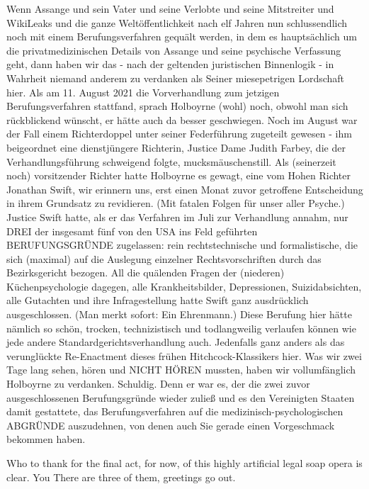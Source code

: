 \begin{multicols}{2}
{Wenn Assange und sein Vater und seine Verlobte und
seine Mitstreiter und WikiLeaks und die ganze Weltöffentlichkeit nach elf Jahren nun schlussendlich noch mit
einem Berufungsverfahren gequält werden, in dem es
hauptsächlich um die privatmedizinischen Details von
Assange und seine psychische Verfassung geht, dann haben wir das - nach der geltenden juristischen Binnenlogik - in Wahrheit niemand anderem zu verdanken als
Seiner miesepetrigen Lordschaft hier.\textCR
Als am 11. August 2021 die Vorverhandlung zum jetzigen
Berufungsverfahren stattfand, sprach Holboyrne (wohl)
noch, obwohl man sich rückblickend wünscht, er hätte
auch da besser geschwiegen. Noch im August war der
Fall einem Richterdoppel unter seiner Federführung zugeteilt gewesen - ihm beigeordnet eine dienstjüngere
Richterin, Justice Dame Judith Farbey, die der Verhandlungsführung schweigend folgte, mucksmäuschenstill.\textCR
Als (seinerzeit noch) vorsitzender Richter hatte Holboyrne es gewagt, eine vom Hohen Richter Jonathan Swift,
wir erinnern uns, erst einen Monat zuvor getroffene Entscheidung in ihrem Grundsatz zu revidieren. (Mit fatalen Folgen für unser aller Psyche.) Justice Swift hatte, als
er das Verfahren im Juli zur Verhandlung annahm, nur
DREI der insgesamt fünf von den USA ins Feld geführten BERUFUNGSGRÜNDE zugelassen: rein rechtstechnische und formalistische, die sich (maximal) auf die
Auslegung einzelner Rechtsvorschriften durch das Bezirksgericht bezogen. All die quälenden Fragen der (niederen) Küchenpsychologie dagegen, alle Krankheitsbilder, Depressionen, Suizidabsichten, alle Gutachten und
ihre Infragestellung hatte Swift ganz ausdrücklich ausgeschlossen. (Man merkt sofort: Ein Ehrenmann.)\textCR
Diese Berufung hier hätte nämlich so schön, trocken,
technizistisch und todlangweilig verlaufen können wie
jede andere Standardgerichtsverhandlung auch. Jedenfalls ganz anders als das verunglückte Re-Enactment
dieses frühen Hitchcock-Klassikers hier.\textCR
Was wir zwei Tage lang sehen, hören und NICHT HÖREN mussten, haben wir vollumfänglich Holboyrne zu
verdanken. Schuldig. Denn er war es, der die zwei zuvor
ausgeschlossenen Berufungsgründe wieder zuließ und
es den Vereinigten Staaten damit gestattete, das Berufungsverfahren auf die medizinisch-psychologischen
ABGRÜNDE auszudehnen, von denen auch Sie gerade
einen Vorgeschmack bekommen haben.}



Who to thank for the final act, for now, of this highly artificial legal soap opera is clear. You
There are three of them, greetings go out.


\end{multicols}
